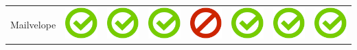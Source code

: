 \documentclass[10pt,foldmark,tumble]{leaflet}
\begin{document}
\begin{center}
{{\begin{tabular}{ L{2cm} | C{2cm} | C{2cm} | C{2cm} | C{2cm} | C{2cm} | C{2cm} | C{2cm} }
Mailvelope   & \includegraphics[scale=0.1]{pics/haken.png} & \includegraphics[scale=0.1]{pics/haken.png} & \includegraphics[scale=0.1]{pics/haken.png} & \includegraphics[scale=0.1]{pics/nohaken.png} & \includegraphics[scale=0.1]{pics/haken.png} & \includegraphics[scale=0.1]{pics/haken.png} & \includegraphics[scale=0.1]{pics/haken.png} \tabularnewline

\end{tabular}}}
\end{center}
\end{document}
